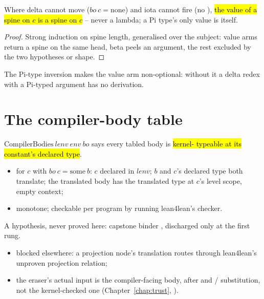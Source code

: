 \begin{lemma}
\label{lem:seval_const_head_value}
\leanok
{}
 Where delta cannot move ($bo\ c=\mathrm{none}$) and iota cannot fire (no
), \hl{the value of a spine on $c$ is a spine on $c$} -- never a lambda; a Pi
type's only value is itself.
\end{lemma}
\begin{proof}
\leanok
{}
 Strong induction on spine length, generalised over the subject: value arms return a
spine on the same head, beta peels an argument, the rest excluded by the two hypotheses or shape.
\end{proof}

\begin{remark}
 The Pi-type inversion makes the  value arm non-optional: without it a
delta redex with a Pi-typed argument has no derivation.
\end{remark}

\section{The compiler-body table}
\label{sec:source:bodies}

\begin{definition}
\label{def:CompilerBodies}
\leanok
{}
 $\mathrm{CompilerBodies}\ lenv\ env\ bo$ says every tabled body is \hl{kernel-
typeable at its constant's declared type}.
\begin{itemize}
\item for $c$ with $bo\ c=\mathrm{some}\ b$: $c$ declared in $lenv$; $b$ and $c$'s declared type
both translate; the translated body has the translated type at $c$'s level scope, empty context;
\item monotone; checkable per program by running lean4lean's checker.
\end{itemize}
\end{definition}

\begin{remark}
 A hypothesis, never proved here: capstone binder , discharged only at the
first rung.
\begin{itemize}
\item blocked elsewhere: a projection node's translation routes through lean4lean's unproven
projection relation;
\item the eraser's actual input is the compiler-facing body, after  and
/ substitution, not the kernel-checked one
(Chapter~\ref{chap:trust}, ).
\end{itemize}
\end{remark}

